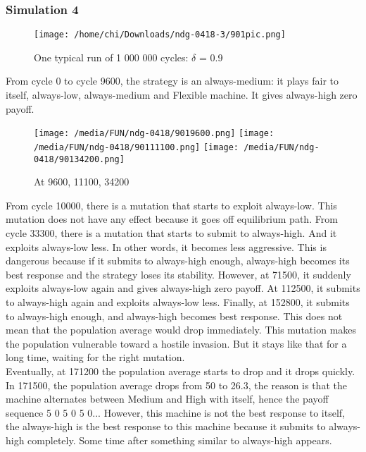 \documentclass[12.5pt]{report}
\begin{document}
\subsubsection{Simulation 4}

\begin{figure}[h!]
\center
\texttt{[image: /home/chi/Downloads/ndg-0418-3/901pic.png]}
\caption{One typical run of 1 000 000 cycles: $\delta$ = 0.9}
\end{figure}

From cycle 0 to cycle 9600, the strategy is an always-medium: it plays fair to itself, always-low, always-medium and Flexible machine. It gives always-high zero payoff.
\begin{figure}[h!]
\center
\texttt{[image: /media/FUN/ndg-0418/9019600.png]}
\texttt{[image: /media/FUN/ndg-0418/90111100.png]}
\texttt{[image: /media/FUN/ndg-0418/90134200.png]}

\caption{At 9600, 11100, 34200}
\end{figure}
From cycle 10000, there is a mutation that starts to exploit always-low. This mutation does not have any effect because it goes off equilibrium path. From cycle 33300, there is a mutation that starts to submit to always-high. And it exploits always-low less. In other words, it becomes less aggressive. This is dangerous because if it submits to always-high enough, always-high becomes its best response and the strategy loses its stability. However, at 71500, it suddenly exploits always-low again and gives always-high zero payoff. At 112500, it submits to always-high again and exploits always-low less. Finally, at 152800, it submits to always-high enough, and always-high becomes best response. This does not mean that the population average would drop immediately. This mutation makes the population vulnerable toward a hostile invasion. But it stays like that for a long time, waiting for the right mutation. \\

Eventually, at 171200 the population average starts to drop and it drops quickly. In 171500, the population average drops from 50 to 26.3, the reason is that the machine alternates between Medium and High with itself, hence the payoff sequence 5 0 5 0 5 0... However, this machine is not the best response to itself, the always-high is the best response to this machine because it submits to always-high completely. Some time after something similar to always-high appears.\\
\end{document}
